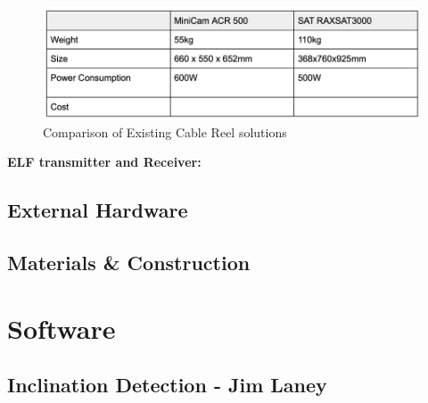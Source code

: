 \documentclass[11pt]{article}		%
\begin{document}
        \begin{figure}[h]
			\centering
			\includegraphics[scale=1]{cablereel.png}
			\caption{Comparison of Existing Cable Reel solutions}
			\label{comparisonComms}
		\end{figure}
        
        \textbf{ELF transmitter and Receiver:}

		\subsection{External Hardware}
		
		
	
		\subsection{Materials \& Construction}
		
	
	\section{Software}
		
		\subsection[Inclination Detection]{Inclination Detection - Jim Laney}
		
\end{document}
